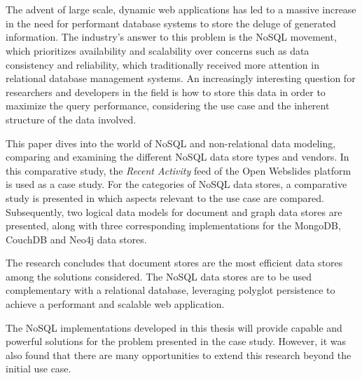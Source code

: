 \chapter*{}

The advent of large scale, dynamic web applications has led to a massive increase in the need for performant database systems to store the deluge of generated information.
The industry's answer to this problem is the NoSQL movement, which prioritizes availability and scalability over concerns such as data consistency and reliability, which traditionally received more attention in relational database management systems.
An increasingly interesting question for researchers and developers in the field is how to store this data in order to maximize the query performance, considering the use case and the inherent structure of the data involved.

This paper dives into the world of NoSQL and non-relational data modeling, comparing and examining the different NoSQL data store types and vendors.
In this comparative study, the \textit{Recent Activity} feed of the Open Webslides platform is used as a case study.
For the  categories of NoSQL data stores, a comparative study is presented in which aspects relevant to the use case are compared.
Subsequently, two logical data models for document and graph data stores are presented, along with three corresponding implementations for the MongoDB, CouchDB and Neo4j data stores.

The research concludes that document stores are the most efficient data stores among the solutions considered.
The NoSQL data stores are to be used complementary with a relational database, leveraging polyglot persistence to achieve a performant and scalable web application.

The NoSQL implementations developed in this thesis will provide capable and powerful solutions for the problem presented in the case study.
However, it was also found that there are many opportunities to extend this research beyond the initial use case.

